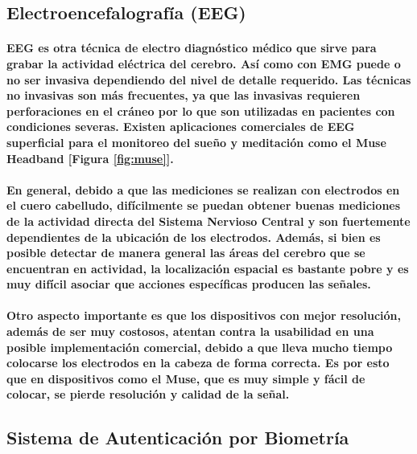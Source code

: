 \documentclass{article}
\begin{document}
\subsection{Electroencefalografía (EEG)}
\paragraph{
EEG es otra técnica de electro diagnóstico médico que sirve para grabar la actividad eléctrica del cerebro. Así como con EMG puede o no ser invasiva dependiendo del nivel de detalle requerido. Las técnicas no invasivas son más frecuentes, ya que las invasivas requieren perforaciones en el cráneo por lo que son utilizadas en pacientes con condiciones severas. Existen aplicaciones comerciales de EEG superficial para el monitoreo del sueño y meditación como el Muse Headband [Figura \ref{fig:muse}].
}
\paragraph{
En general, debido a que las mediciones se realizan con electrodos en el cuero cabelludo, difícilmente se puedan obtener buenas mediciones de la actividad directa del Sistema Nervioso Central y son fuertemente dependientes de la ubicación de los electrodos. Además, si bien es posible detectar de manera general las áreas del cerebro que se encuentran en actividad, la localización espacial es bastante pobre y es muy difícil asociar que acciones específicas producen las señales.
}
\paragraph{
Otro aspecto importante es que los dispositivos con mejor resolución, además de ser muy costosos, atentan contra la usabilidad en una posible implementación comercial, debido a que lleva mucho tiempo colocarse los electrodos en la cabeza de forma correcta. Es por esto que en dispositivos como el Muse, que es muy simple y fácil de colocar, se pierde resolución y calidad de la señal.
}


\subsection{Sistema de Autenticación por Biometría}
\end{document}
